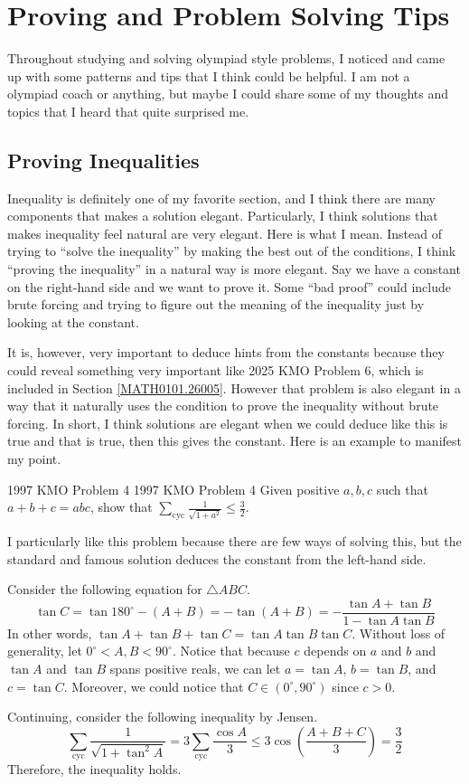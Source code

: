 \documentclass[../../../main.tex]{subfiles}
\begin{document}
\section{Proving and Problem Solving Tips}

Throughout studying and solving olympiad style problems, I noticed
and came up with some patterns and tips that I think could be
helpful. I am not a olympiad coach or anything, but maybe I could
share some of my thoughts and topics that I heard that quite
surprised me.

\subsection{Proving Inequalities}

Inequality is definitely one of my favorite section, and I think
there are many components that makes a solution elegant. Particularly,
I think solutions that makes inequality feel natural are very
elegant. Here is what I mean. Instead of trying to ``solve the
inequality'' by making the best out of the conditions, I think
``proving the inequality'' in a natural way is more elegant.
Say we have a constant on the right-hand side and we want to prove it.
Some ``bad proof'' could include brute forcing and trying to figure
out the meaning of the inequality just by looking at the constant.

It is, however, very important to deduce hints from the constants
because they could reveal something very important like 2025 KMO
Problem 6, which is included in Section \ref{MATH0101.26005}.
However that problem is also elegant in a way that it naturally uses
the condition to prove the inequality without brute forcing.
In short, I think solutions are elegant when we could deduce like
this is true and that is true, then this gives the constant.
Here is an example to manifest my point.

\begin{problem}{1997 KMO Problem 4 \easy}{1997 KMO Problem 4}
Given positive $a, b, c$ such that $a + b + c = abc$, show that
$\sum_\text{cyc} \frac{1}{\sqrt{1 + a^2}} \leq \frac{3}{2}$.
\end{problem}
\begin{solution}
I particularly like this problem because there are few ways of
solving this, but the standard and famous solution deduces the
constant from the left-hand side.

Consider the following equation for $\triangle{ABC}$.
\[
\tan C
= \tan{180^\circ - (A + B)}
= -\tan(A + B)
= - \frac{\tan A + \tan B}{1 - \tan A \tan B}
\]
In other words, $\tan A + \tan B + \tan C = \tan A \tan B \tan C$.
Without loss of generality, let $0^\circ < A, B < 90^\circ$.
Notice that because $c$ depends on $a$ and $b$ and $\tan A$ and
$\tan B$ spans positive reals, we can let $a = \tan A$, $b = \tan B$,
and $c = \tan C$. Moreover, we could notice that $C \in
(0^\circ, 90^\circ)$ since $c > 0$.

Continuing, consider the following inequality by Jensen.
\[
\sum_\text{cyc} \frac{1}{\sqrt{1 + \tan^2 A}}
= 3 \sum_\text{cyc} \frac{\cos A}{3}
\leq 3 \cos \left( \frac{A + B + C}{3} \right)
= \frac{3}{2}
\]
Therefore, the inequality holds.
\end{solution}
\end{document}
